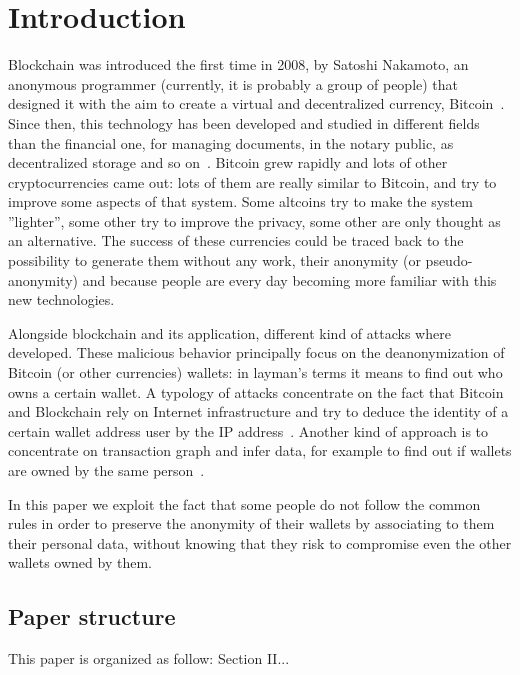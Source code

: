 \section{Introduction}
Blockchain was introduced the first time in 2008, by Satoshi Nakamoto, an
anonymous programmer (currently, it is probably a group of people) that
designed it with the aim to create a virtual and decentralized currency,
Bitcoin~\cite{bib:satoshi}. Since then, this technology has been developed and
studied in different fields than the financial one, for managing documents, in
the notary public, as decentralized storage and so on~\cite{bib:air}. Bitcoin
grew rapidly and lots of other cryptocurrencies came out: lots of them are
really similar to Bitcoin, and try to improve some aspects of that system. Some
altcoins try to make the system ''lighter'', some other try to improve the
privacy, some other are only thought as an alternative. The success of these
currencies could be traced back to the possibility to generate them without
any  work, their anonymity (or pseudo-anonymity) and because people are every
day becoming more familiar with this new technologies.

Alongside blockchain and its application, different kind of attacks where
developed. These malicious behavior principally focus on the deanonymization of
Bitcoin (or other currencies) wallets: in layman's terms it means to find out
who owns a certain wallet. A typology of attacks concentrate on the fact that
Bitcoin and Blockchain rely on Internet infrastructure and try to deduce the
identity of a certain wallet address user by the IP address~\cite{bib:deanon}.
Another kind of approach is to concentrate on transaction graph and infer data,
for example to find out if wallets are owned by the same
person~\cite{bib:fistful}.

In this paper we exploit the fact that some people do not follow the common
rules in order to preserve the anonymity of their wallets by associating to them
their personal data, without knowing that they risk to compromise even the other
wallets owned by them.


\subsection{Paper structure}
This paper is organized as follow: Section II...